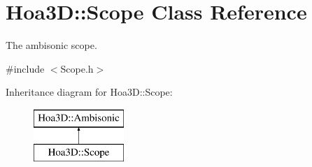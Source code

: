 \hypertarget{class_hoa3_d_1_1_scope}{\section{Hoa3\-D\-:\-:Scope Class Reference}
\label{class_hoa3_d_1_1_scope}
}


The ambisonic scope.  




{\ttfamily \#include $<$Scope.\-h$>$}

Inheritance diagram for Hoa3\-D\-:\-:Scope\-:\begin{figure}[H]
\begin{center}
\leavevmode
\includegraphics[height=2.000000cm]{class_hoa3_d_1_1_scope}
\end{center}
\end{figure}
